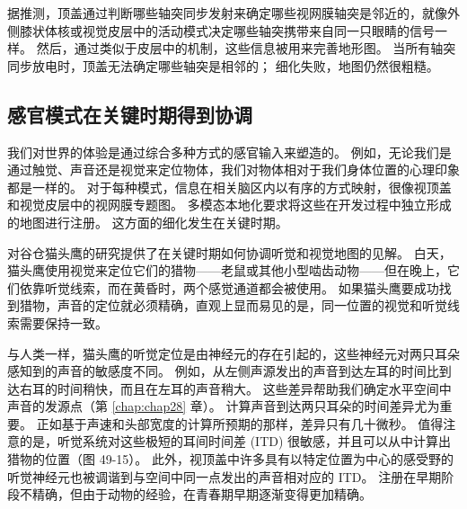 据推测，顶盖通过判断哪些轴突同步发射来确定哪些视网膜轴突是邻近的，就像外侧膝状体核或视觉皮层中的活动模式决定哪些轴突携带来自同一只眼睛的信号一样。
然后，通过类似于皮层中的机制，这些信息被用来完善地形图。
当所有轴突同步放电时，顶盖无法确定哪些轴突是相邻的；
细化失败，地图仍然很粗糙。



\subsection{感官模式在关键时期得到协调}

我们对世界的体验是通过综合多种方式的感官输入来塑造的。
例如，无论我们是通过触觉、声音还是视觉来定位物体，我们对物体相对于我们身体位置的心理印象都是一样的。
对于每种模式，信息在相关脑区内以有序的方式映射，很像视顶盖和视觉皮层中的视网膜专题图。
多模态本地化要求将这些在开发过程中独立形成的地图进行注册。
这方面的细化发生在关键时期。


对谷仓猫头鹰的研究提供了在关键时期如何协调听觉和视觉地图的见解。
白天，猫头鹰使用视觉来定位它们的猎物——老鼠或其他小型啮齿动物——但在晚上，它们依靠听觉线索，而在黄昏时，两个感觉通道都会被使用。
如果猫头鹰要成功找到猎物，声音的定位就必须精确，直观上显而易见的是，同一位置的视觉和听觉线索需要保持一致。


与人类一样，猫头鹰的听觉定位是由神经元的存在引起的，这些神经元对两只耳朵感知到的声音的敏感度不同。 例如，从左侧声源发出的声音到达左耳的时间比到达右耳的时间稍快，而且在左耳的声音稍大。
这些差异帮助我们确定水平空间中声音的发源点（第 \ref{chap:chap28} 章）。
计算声音到达两只耳朵的时间差异尤为重要。
正如基于声速和头部宽度的计算所预期的那样，差异只有几十微秒。
值得注意的是，听觉系统对这些极短的耳间时间差 (ITD) 很敏感，并且可以从中计算出猎物的位置（图 49-15）。
此外，视顶盖中许多具有以特定位置为中心的感受野的听觉神经元也被调谐到与空间中同一点发出的声音相对应的 ITD。
注册在早期阶段不精确，但由于动物的经验，在青春期早期逐渐变得更加精确。


